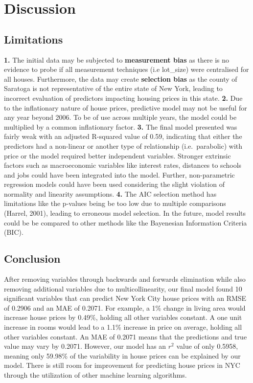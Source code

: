 \documentclass[letterpaper,8pt,twocolumn,twoside,]{pinp}
\begin{document}
\hypertarget{discussion}{%
\section{Discussion}\label{discussion}}

\hypertarget{limitations}{%
\subsection{Limitations}\label{limitations}}

\textbf{1.} The initial data may be subjected to \textbf{measurement
bias} as there is no evidence to probe if all measurement techniques
(i.e lot\_size) were centralised for all houses. Furthermore, the data
may create \textbf{selection bias} as the county of Saratoga is not
representative of the entire state of New York, leading to incorrect
evaluation of predictors impacting housing prices in this state.
\textbf{2.} Due to the inflationary nature of house prices, predictive
model may not be useful for any year beyond 2006. To be of use across
multiple years, the model could be multiplied by a common inflationary
factor. \textbf{3.} The final model presented was fairly weak with an
adjusted R-squared value of 0.59, indicating that either the predictors
had a non-linear or another type of relationship (i.e.~parabolic) with
price or the model required better independent variables. Stronger
extrinsic factors such as macroeconomic variables like interest rates,
distances to schools and jobs could have been integrated into the model.
Further, non-parametric regression models could have been used
considering the slight violation of normality and linearity assumptions.
\textbf{4.} The AIC selection method has limitations like the p-values
being be too low due to multiple comparisons (Harrel, 2001), leading to
erroneous model selection. In the future, model results could be be
compared to other methods like the Bayenesian Information Criteria
(BIC).

\hypertarget{conclusion}{%
\subsection{Conclusion}\label{conclusion}}

After removing variables through backwards and forwards elimination
while also removing additional variables due to multicollinearity, our
final model found 10 significant variables that can predict New York
City house prices with an RMSE of 0.2906 and an MAE of 0.2071. For
example, a 1\% change in living area would increase house prices by
0.49\%, holding all other variables constant. A one unit increase in
rooms would lead to a 1.1\% increase in price on average, holding all
other variables constant. An MAE of 0.2071 means that the predictions
and true value may vary by 0.2071. However, our model has an \(r^2\)
value of only 0.5958, meaning only 59.98\% of the variability in house
prices can be explained by our model. There is still room for
improvement for predicting house prices in NYC through the utilization
of other machine learning algorithms.
\end{document}
